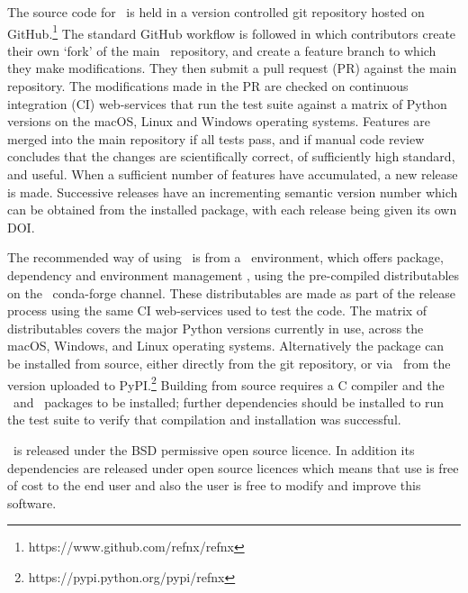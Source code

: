 \documentclass[pdf,preprint]{iucr}
\begin{document}
The source code for \ is held in a version controlled git repository hosted on GitHub.\footnote{https://www.github.com/refnx/refnx} The standard GitHub workflow is followed in which contributors create their own `fork' of the main \ repository, and create a feature branch to which they make modifications. They then submit a pull request (PR) against the main repository. The modifications made in the PR are checked on continuous integration (CI) web-services that run the test suite against a matrix of Python versions on the macOS, Linux and Windows operating systems. Features are merged into the main repository if all tests pass, and if manual code review concludes that the changes are scientifically correct, of sufficiently high standard, and useful. When a sufficient number of features have accumulated, a new release is made. Successive releases have an incrementing semantic version number which can be obtained from the installed package, with each release being given its own DOI.

The recommended way of using \ is from a \conda\ environment, which offers package, dependency and environment management \cite{conda}, using the pre-compiled distributables on the \ conda-forge channel. These distributables are made as part of the release process using the same CI web-services used to test the code. The matrix of distributables covers the major Python versions currently in use, across the macOS, Windows, and Linux operating systems. Alternatively the package can be installed from source, either directly from the git repository, or via \pip\ from the version uploaded to PyPI.\footnote{https://pypi.python.org/pypi/refnx} Building from source requires a C compiler and the \Cython\ and \NumPy\ packages to be installed; further dependencies should be installed to run the test suite to verify that compilation and installation was successful.




\ is released under the BSD permissive open source licence. In addition its dependencies are released under open source licences which means that use is free of cost to the end user and also the user is free to modify and improve this software.
\end{document}

